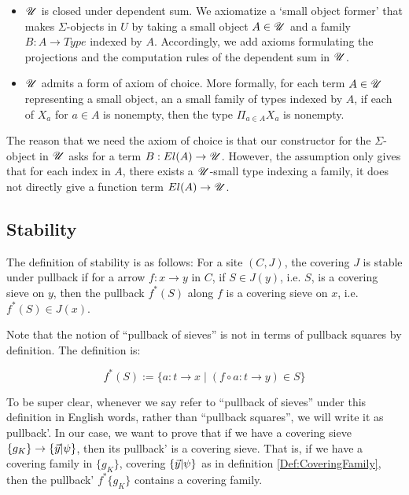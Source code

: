 \begin{itemize}
  \item $\mathscr{U}$ is closed under dependent sum. We axiomatize a `small object former' that makes $\Sigma$-objects in $U$ by
  taking a small object $A\in \mathscr{U}$ and a family $B:A\to Type$ indexed by $A$. Accordingly, we add axioms formulating
  the projections and the computation rules of the dependent sum in $\mathscr{U}$.
  \item $\mathscr{U}$ admits a form of axiom of choice. More formally, for each term $A\in \mathscr{U}$ representing a
  small object, an a small family of types indexed by $A$, if each of $X_a$ for $a\in A$ is nonempty, then the type
  $\Pi_{a\in A}X_a$ is nonempty.
\end{itemize}


The reason that we need the axiom of choice is that our constructor for the $\Sigma$-object in $\mathscr{U}$ asks
for a term $B: El(A)\to \mathscr{U}$. However, the assumption only gives that for each index in $A$, there exists a $\mathscr{U}$-small
type indexing a family, it does not directly give a function term $El(A)\to \mathscr{U}$.





\subsection{Stability}

The definition of stability is as follows: For a site $(C,J)$, the covering $J$ is stable under pullback if for a arrow $f:x\to y$ in $C$,
if $S\in J(y)$, i.e. $S$, is a covering sieve on $y$, then the pullback $f^*(S)$ along $f$ is a covering sieve on $x$, i.e. $f^*(S) \in J(x)$.

Note that the notion of ``pullback of sieves'' is not in terms of pullback squares by definition. The definition is:


\begin{equation*}
  f^*(S) := \{a: t \to x \mid (f\circ a: t\to y) \in S\}
\end{equation*}

To be super clear, whenever we say refer to ``pullback of sieves'' under this definition in English words, rather than ``pullback squares'', we will write it
as pullback'.
In our case, we want to prove that if we have a covering sieve $\{g_K\}\to \{ \vec{y} | \psi \}$, then its pullback' is a covering sieve.
That is, if we have a covering family in $\{g_K\}$, covering $\{ \vec{y} | \psi \}$ as in definition \ref{Def:CoveringFamily}, then the pullback'
$f^*\{g_K\}$ contains a covering family.

